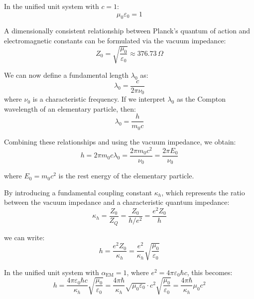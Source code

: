 \documentclass[12pt,a4paper]{article}
\newcommand{\alphaEM}{\alpha_{\text{EM}}}
\begin{document}
	In the unified unit system with \(c = 1\):
	\begin{equation}
		\mu_0 \varepsilon_0 = 1
	\end{equation}
	
	A dimensionally consistent relationship between Planck’s quantum of action and electromagnetic constants can be formulated via the vacuum impedance:
	\begin{equation}
		Z_0 = \sqrt{\frac{\mu_0}{\varepsilon_0}} \approx 376.73 \, \Omega
	\end{equation}
	
	We can now define a fundamental length \(\lambda_0\) as:
	\begin{equation}
		\lambda_0 = \frac{c}{2\pi \nu_0}
	\end{equation}
	where \(\nu_0\) is a characteristic frequency. If we interpret \(\lambda_0\) as the Compton wavelength of an elementary particle, then:
	\begin{equation}
		\lambda_0 = \frac{h}{m_0 c}
	\end{equation}
	
	Combining these relationships and using the vacuum impedance, we obtain:
	\begin{equation}
		h = 2\pi m_0 c \lambda_0 = \frac{2\pi m_0 c^2}{\nu_0} = \frac{2\pi E_0}{\nu_0}
	\end{equation}
	
	where \(E_0 = m_0 c^2\) is the rest energy of the elementary particle.
	
	By introducing a fundamental coupling constant \(\kappa_h\), which represents the ratio between the vacuum impedance and a characteristic quantum impedance:
	\begin{equation}
		\kappa_h = \frac{Z_0}{Z_Q} = \frac{Z_0}{h/e^2} = \frac{e^2 Z_0}{h}
	\end{equation}
	
	we can write:
	\begin{equation}
		h = \frac{e^2 Z_0}{\kappa_h} = \frac{e^2}{\kappa_h} \sqrt{\frac{\mu_0}{\varepsilon_0}}
	\end{equation}
	
	In the unified unit system with \(\alphaEM = 1\), where \(e^2 = 4\pi\varepsilon_0\hbar c\), this becomes:
	\begin{equation}
		h = \frac{4\pi\varepsilon_0\hbar c}{\kappa_h} \sqrt{\frac{\mu_0}{\varepsilon_0}} = \frac{4\pi\hbar}{\kappa_h} \sqrt{\mu_0\varepsilon_0} \cdot c^2 \sqrt{\frac{\mu_0}{\varepsilon_0}} = \frac{4\pi\hbar}{\kappa_h} \mu_0 c^2
	\end{equation}
	
\end{document}
